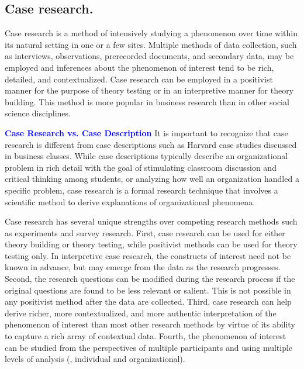 \subsection{Case research.} Case research is a method of intensively studying a phenomenon over time within its natural setting in one or a few sites. Multiple methods of data collection, such as interviews, observations, prerecorded documents, and secondary data, may be employed and inferences about the phenomenon of interest tend to be rich, detailed, and contextualized. Case research can be employed in a positivist manner for the purpose of theory testing or in an interpretive manner for theory building. This method is more popular in business research than in other social science disciplines.

\begin{tcolorbox}[colback=blue!5!white,colframe=blue!75!black]
	\textcolor{blue}{\textbf{Case Research vs. Case Description}}
	\tcblower
	It is important to recognize that case research is different from case descriptions such as Harvard case studies discussed in business classes. While case descriptions typically describe an organizational problem in rich detail with the goal of stimulating classroom discussion and critical thinking among students, or analyzing how well an organization handled a specific problem, case research is a formal research technique that involves a scientific method to derive explanations of organizational phenomena.
\end{tcolorbox}

Case research has several unique strengths over competing research methods such as experiments and survey research. First, case research can be used for either theory building or theory testing, while positivist methods can be used for theory testing only. In interpretive case research, the constructs of interest need not be known in advance, but may emerge from the data as the research progresses. Second, the research questions can be modified during the research process if the original questions are found to be less relevant or salient. This is not possible in any positivist method after the data are collected. Third, case research can help derive richer, more contextualized, and more authentic interpretation of the phenomenon of interest than most other research methods by virtue of its ability to capture a rich array of contextual data. Fourth, the phenomenon of interest can be studied from the perspectives of multiple participants and using multiple levels of analysis (\eg, individual and organizational).


